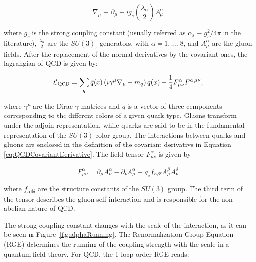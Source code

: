 \begin{equation}
\nabla_\mu \equiv \partial_\mu - ig_s \left(\frac{\lambda_\alpha}{2}\right)A_\mu^\alpha
\label{eq:QCDCovariantDerivative}
\end{equation}

\noindent where $g_s$ is the strong coupling constant (usually referred as $\alpha_s\equiv g_s^2 / 4\pi$ in the literature), $\frac{\lambda_\alpha}{2}$ are the $SU(3)_c$ generators, with $\alpha=1,\ldots,8$, and $A_\mu^\alpha$ are the gluon fields.
After the replacement of the normal derivatives by the covariant ones, the lagrangian of QCD is given by:

\begin{equation}
\mathcal{L}_{\text{QCD}} = \sum_{q}{\bar{q}(x)\left(i\gamma^\mu \nabla_\mu - m_q\right)q(x) - \frac{1}{4}F^{\alpha}_{\mu\nu}F^{\alpha\,\mu\nu}},
\label{eq:QCDlagrangian}
\end{equation}

\noindent where $\gamma^{\mu}$ are the Dirac $\gamma$-matrices and $q$ is a vector of three components corresponding to the different colors of a given quark type.
Gluons transform under the adjoin representation, while quarks are said to be in the fundamental representation of the $SU(3)$ color group.
The interactions between quarks and gluons are enclosed in the definition of the covariant derivative in Equation \ref{eq:QCDCovariantDerivative}.
The field tensor $F^{\alpha}_{\mu\nu}$ is given by

\begin{equation}
F^{\alpha}_{\mu\nu} = \partial_{\mu}A_{\nu}^{\alpha} - \partial_{\nu}A_{\mu}^{\alpha} - g_s f_{\alpha\beta\delta}A_{\mu}^{\beta}A_{\nu}^{\delta} 
\label{eq:fieldTensorQCD}
\end{equation}

\noindent where $ f_{\alpha\beta\delta}$ are the structure constants of the $SU(3)$ group.
The third term of the tensor describes the gluon self-interaction and is responsible for the non-abelian nature of QCD.

The strong coupling constant changes with the scale of the interaction, as it can be seen in Figure~\ref{fig:alphaRunning}.
The Renormalization Group Equation (RGE) determines the running of the coupling strength with the scale in a quantum field theory. 
For QCD, the 1-loop order RGE reads:

